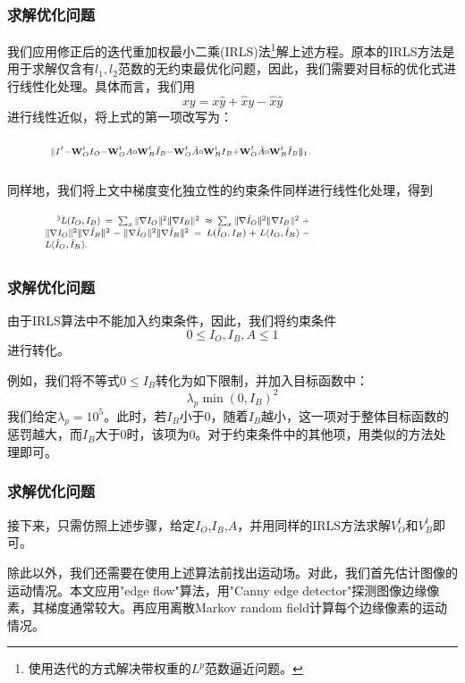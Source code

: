 \documentclass{beamer}
\begin{document}
\begin{frame}
\frametitle{求解优化问题}
我们应用修正后的迭代重加权最小二乘(IRLS)法\footnote{使用迭代的方式解决带权重的$L^p$范数逼近问题。}解上述方程。原本的IRLS方法是用于求解仅含有$l_1,l_2$范数的无约束最优化问题，因此，我们需要对目标的优化式进行线性化处理。具体而言，我们用
\begin{equation}
xy = x\hat{y}+\hat{x}y-\hat{x}\hat{y}
\end{equation}
进行线性近似，将上式的第一项改写为：
\begin{figure}[!h]
\centering
\includegraphics[height=0.8cm,width=8cm]{2022122604.png}
\end{figure}\pause
同样地，我们将上文中梯度变化独立性的约束条件同样进行线性化处理，得到
\begin{figure}[!h]
\centering
\includegraphics[height=1.2cm,width=8cm]{2022122605.png}
\end{figure}
\end{frame}
\begin{frame}
\frametitle{求解优化问题}
由于IRLS算法中不能加入约束条件，因此，我们将约束条件
\begin{equation}
0\leq I_O,I_B,A\leq 1
\end{equation}
进行转化。

例如，我们将不等式$0\leq I_B$转化为如下限制，并加入目标函数中：
\begin{equation}
\lambda_p\min(0,I_B)^2
\end{equation}\pause
我们给定$\lambda_p = 10^5$。此时，若$I_B$小于0，随着$I_B$越小，这一项对于整体目标函数的惩罚越大，而$I_B$大于0时，该项为0。对于约束条件中的其他项，用类似的方法处理即可。
\end{frame}
\begin{frame}
\frametitle{求解优化问题}
接下来，只需仿照上述步骤，给定$I_O$,$I_B$,$A$，并用同样的IRLS方法求解$V_O^t$和$V_B^t$即可。\pause

除此以外，我们还需要在使用上述算法前找出运动场。对此，我们首先估计图像的运动情况。本文应用"edge flow"算法，用"Canny edge detector"探测图像边缘像素，其梯度通常较大。再应用离散Markov random field计算每个边缘像素的运动情况。
\end{frame}
\end{document}
